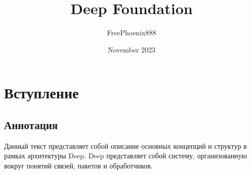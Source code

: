 \documentclass{article}
\title{Deep Foundation}
\author{FreePhoenix888}
\date{November 2023}
\begin{document}
\maketitle

\newpage %

\section{Вступление}
\subsection{Аннотация}

Данный текст представляет собой описание основных концепций и структур в рамках архитектуры Deep. Deep представляет собой систему, организованную вокруг понятий связей, пакетов и обработчиков. 
\end{document}
